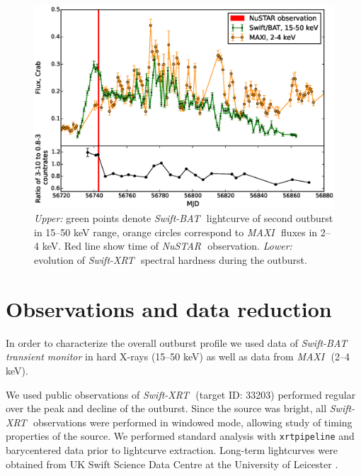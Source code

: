 \documentclass[a4paper,fleqn,usenatbib]{mnras}
\def\swiftx{{\em Swift-XRT\,}}
\def\swiftb{{\em Swift-BAT\,}}
\def\nustar{{\em NuSTAR\,}}
\def\integral{{\em INTEGRAL\,}}
\def\maxi{{\em MAXI\,}}
\begin{document}


\begin{figure}
\centerline{\includegraphics[scale=0.5]{batlc_v06.eps}}
\caption{{\it Upper:} green points denote \swiftb\, lightcurve of second outburst in 15--50 keV range, orange circles correspond to \maxi\, fluxes in 2--4 keV. Red line show time of \nustar\, observation. {\it Lower:} evolution of \swiftx\, spectral hardness during the outburst.} 
\label{fig:batlc}
\end{figure} 

\section{Observations and data reduction}
\label{sec:datared} 
In order to characterize the overall outburst profile we used data of \swiftb\, {\it transient monitor} \citep{krimm13bat} in hard X-rays (15--50 keV) as well as data from \maxi\, \citep{matsuoka13maxi} (2--4 keV).

We used public observations of \swiftx\, (target ID: 33203) performed regular over the peak and decline of the outburst.  Since the source was bright, all \swiftx\, observations were performed in windowed mode, allowing study of timing properties of the source. We performed standard analysis with {\texttt{xrtpipeline}} and barycentered data prior to lightcurve extraction. 
Long-term lightcurves were obtained from UK Swift Science Data Centre at the University of Leicester \citep{evans09}.
\end{document}
